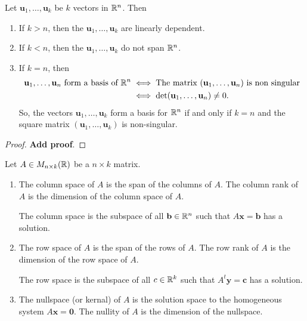 \documentclass[10pt, a4paper]{article}
\newcommand{\mbf}[1]{\mathbf{#1}}
\begin{document}
\begin{theorem}
    Let $\mbf{u}_1, \dotsc, \mbf{u}_k$ be $k$ vectors in $\mathbb{R} ^ n$.
    Then
    \begin{enumerate}[label = (\roman*)]
        \item If $k > n$,
        then the $\mbf{u}_1, \dotsc, \mbf{u}_k$ are linearly dependent.
        \item If $k < n$,
        then the $\mbf{u}_1, \dotsc, \mbf{u}_k$ do not span $\mathbb{R} ^ n$.
        \item If $k = n$,
        then
        \begin{align*}
            \mbf{u}_1, \dotsc, \mbf{u}_n\text{ form a basis of } \R ^ n &\iff\text{The matrix $(\mbf{u}_1, \dotsc, \mbf{u}_n)$ is non singular} \\
            &\iff \det(\mbf{u}_1, \dotsc, \mbf{u}_n) \neq 0.
        \end{align*}
        So,
        the vectors $\mbf{u}_1, \dotsc, \mbf{u}_k$ form a basis for $\mathbb{R} ^ n$ if and only if $k = n$ and the square matrix $(\mbf{u}_1, \dotsc, \mbf{u}_k)$ is non-singular.
    \end{enumerate}
    \begin{proof}
        \textbf{Add proof}.
    \end{proof}
\end{theorem}

\begin{definition}
    Let $A \in M_{n \times k}(\mathbb{R})$ be a $n \times k$ matrix.
    \begin{enumerate}[label = (\roman*)]
        \item The column space of $A$ is the span of the columns of $A$.
        The column rank of $A$ is the dimension of the column space of $A$.

        The column space is the subspace of all $\mbf{b} \in \R ^ n$ such that $A\mbf{x} = \mbf{b}$ has a solution.

        \item The row space of $A$ is the span of the rows of $A$.
        The row rank of $A$ is the dimension of the row space of $A$.

        The row space is the subspace of all $c \in \mathbb{R} ^ k$ such that $A ^ t\mbf{y} = \mbf{c}$ has a solution.

        \item The nullspace
        (or kernal)
        of $A$ is the solution space to the homogeneous system $A\mbf{x} = \mbf{0}$.
        The nullity of $A$ is the dimension of the nullspace.
    \end{enumerate}
\end{definition}
\end{document}

